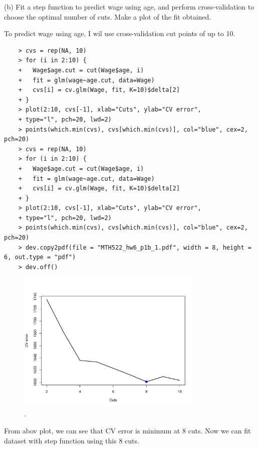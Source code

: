 \documentclass{article}
\begin{document}
\newpage

(b) Fit a step function to predict wage using age, and perform cross-validation to choose the optimal number of cuts. Make a plot of the fit obtained.

To predict wage using age, I wil use cross-validation cut points of up to 10.

\begin{program}
	\begin{verbatim}
	> cvs = rep(NA, 10)
	> for (i in 2:10) {
	+   Wage$age.cut = cut(Wage$age, i)
	+   fit = glm(wage~age.cut, data=Wage)
	+   cvs[i] = cv.glm(Wage, fit, K=10)$delta[2]
	+ }
	> plot(2:10, cvs[-1], xlab="Cuts", ylab="CV error",
	+ type="l", pch=20, lwd=2)
	> points(which.min(cvs), cvs[which.min(cvs)], col="blue", cex=2, pch=20)
	> cvs = rep(NA, 10)
	> for (i in 2:10) {
	+   Wage$age.cut = cut(Wage$age, i)
	+   fit = glm(wage~age.cut, data=Wage)
	+   cvs[i] = cv.glm(Wage, fit, K=10)$delta[2]
	+ }
	> plot(2:10, cvs[-1], xlab="Cuts", ylab="CV error",
	+ type="l", pch=20, lwd=2)
	> points(which.min(cvs), cvs[which.min(cvs)], col="blue", cex=2, pch=20)
	> dev.copy2pdf(file = "MTH522_hw6_p1b_1.pdf", width = 8, height = 6, out.type = "pdf")  
	> dev.off()
	\end{verbatim}
\end{program}

\begin{figure}[htb]
	\begin{center}
		\includegraphics[width=0.8\textwidth]{MTH522_hw6_p1b_1.pdf}
	\end{center}
	\caption{.}
	\label{fig:MTH522_hw6_p1b_1}
\end{figure}

From abov plot, we can see that CV error is minimum at 8 cuts. Now we can fit dataset with step function using this 8 cuts.
\end{document}
